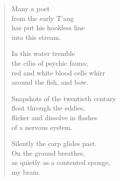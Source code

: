 {\begin{verse}
Many a poet\\
from the early T'ang\\
has put his hookless line\\
into this stream.

In this water tremble\\
the cilia of psychic fauna;\\
red and white blood cells whirr\\
around the fish, and bow.

Snapshots of the twentieth century\\
float through the eddies,\\
flicker and dissolve in flashes\\
of a nervous system.

Silently the carp glides past.\\
On the ground breathes,\\
as quietly as a contented sponge,\\
my brain.

\end{verse}

}
